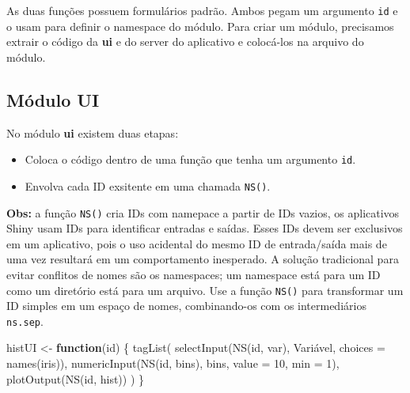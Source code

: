 \documentclass[
]{book}
\newenvironment{Shaded}{\begin{snugshade}}{\end{snugshade}}
\newcommand{\AttributeTok}[1]{\textcolor[rgb]{0.77,0.63,0.00}{#1}}
\newcommand{\ControlFlowTok}[1]{\textcolor[rgb]{0.13,0.29,0.53}{\textbf{#1}}}
\newcommand{\DecValTok}[1]{\textcolor[rgb]{0.00,0.00,0.81}{#1}}
\newcommand{\FunctionTok}[1]{\textcolor[rgb]{0.00,0.00,0.00}{#1}}
\newcommand{\NormalTok}[1]{#1}
\newcommand{\OtherTok}[1]{\textcolor[rgb]{0.56,0.35,0.01}{#1}}
\newcommand{\StringTok}[1]{\textcolor[rgb]{0.31,0.60,0.02}{#1}}
\begin{document}
As duas funções possuem formulários padrão. Ambos pegam um argumento \texttt{id} e o usam para definir o namespace do módulo. Para criar um módulo, precisamos extrair o código da \textbf{ui} e do server do aplicativo e colocá-los na arquivo do módulo.

\hypertarget{muxf3dulo-ui}{%
\subsection{\texorpdfstring{\textbf{Módulo UI}}{Módulo UI}}\label{muxf3dulo-ui}}

No módulo \textbf{ui} existem duas etapas:

\begin{itemize}
\item
  Coloca o código dentro de uma função que tenha um argumento \texttt{id}.
\item
  Envolva cada ID exsitente em uma chamada \texttt{NS()}.
\end{itemize}

\textbf{Obs:} a função \texttt{NS()} cria IDs com namepace a partir de IDs vazios, os aplicativos Shiny usam IDs para identificar entradas e saídas. Esses IDs devem ser exclusivos em um aplicativo, pois o uso acidental do mesmo ID de entrada/saída mais de uma vez resultará em um comportamento inesperado. A solução tradicional para evitar conflitos de nomes são os namespaces; um namespace está para um ID como um diretório está para um arquivo. Use a função \texttt{NS()} para transformar um ID simples em um espaço de nomes, combinando-os com os intermediários \texttt{ns.sep}.

\begin{Shaded}
\begin{Highlighting}[]
\NormalTok{histUI }\OtherTok{\textless{}{-}} \ControlFlowTok{function}\NormalTok{(id) \{}
  \FunctionTok{tagList}\NormalTok{(}
    \FunctionTok{selectInput}\NormalTok{(}\FunctionTok{NS}\NormalTok{(id, }\StringTok{\textquotesingle{}var\textquotesingle{}}\NormalTok{), }\StringTok{\textquotesingle{}Variável\textquotesingle{}}\NormalTok{, }\AttributeTok{choices =} \FunctionTok{names}\NormalTok{(iris)),}
    \FunctionTok{numericInput}\NormalTok{(}\FunctionTok{NS}\NormalTok{(id, }\StringTok{\textquotesingle{}bins\textquotesingle{}}\NormalTok{), }\StringTok{\textquotesingle{}bins\textquotesingle{}}\NormalTok{, }\AttributeTok{value =} \DecValTok{10}\NormalTok{, }\AttributeTok{min =} \DecValTok{1}\NormalTok{),}
    \FunctionTok{plotOutput}\NormalTok{(}\FunctionTok{NS}\NormalTok{(id, }\StringTok{\textquotesingle{}hist\textquotesingle{}}\NormalTok{))}
\NormalTok{  )}
\NormalTok{\}}
\end{Highlighting}
\end{Shaded}
\end{document}
